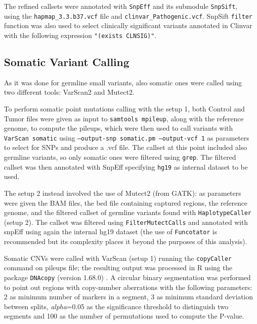 \documentclass[11pt]{article}
\begin{document}
The refined callsets were annotated with \texttt{SnpEff}\cite{cingolani2012program} and its submodule \texttt{SnpSift}\cite{cingolani2012using}, using the \texttt{hapmap\_3.3.b37.vcf} file and \texttt{clinvar\_Pathogenic.vcf}. SnpSift \texttt{filter} function was also used to select clinically significant variants annotated in Clinvar with the following expression \texttt{"(exists CLNSIG)"}. 



\subsection*{Somatic Variant Calling}

As it was done for germline small variants, also somatic ones were called using two different tools: VarScan2 and Mutect2. 

To perform somatic point mutations calling with the setup 1, both Control and Tumor files were given as input to \texttt{samtools mpileup}, along with the reference genome, to compute the pileups, which were then used to call variants with \texttt{VarScan somatic} using \texttt{--output-snp somatic.pm --output-vcf 1} as parameters to select for SNPs and produce a .vcf file. The callset at this point included also germline variants, so only somatic ones were filtered using \texttt{grep}. The filtered callset was then annotated with SnpEff specifying \texttt{hg19} as internal dataset to be used.

The setup 2 instead involved the use of Mutect2 (from GATK): as parameters were given the BAM files, the bed file containing captured regions, the reference genome, and the filtered callset of germline variants found with \texttt{HaplotypeCaller} (setup 2). The callset was filtered using \texttt{FilterMutectCalls} and annotated with snpEff using again the internal hg19 dataset (the use of \texttt{Funcotator} is recommended but its complexity places it beyond the purposes of this analysis). 

Somatic CNVs were called with VarScan (setup 1) running the \texttt{copyCaller} command on pileups file; the resulting output was processed in R using the package \texttt{DNAcopy} (version 1.68.0) \cite{DNAcopy}. A circular binary segmentation was performed to point out regions with copy-number aberrations with the following parameters: 2 as minimum number of markers in a segment, 3 as minimum standard deviation between splits, \textit{alpha}=0.05 as the significance threshold to distinguish two segments and 100 as the number of permutations used to compute the P-value.
\end{document}
